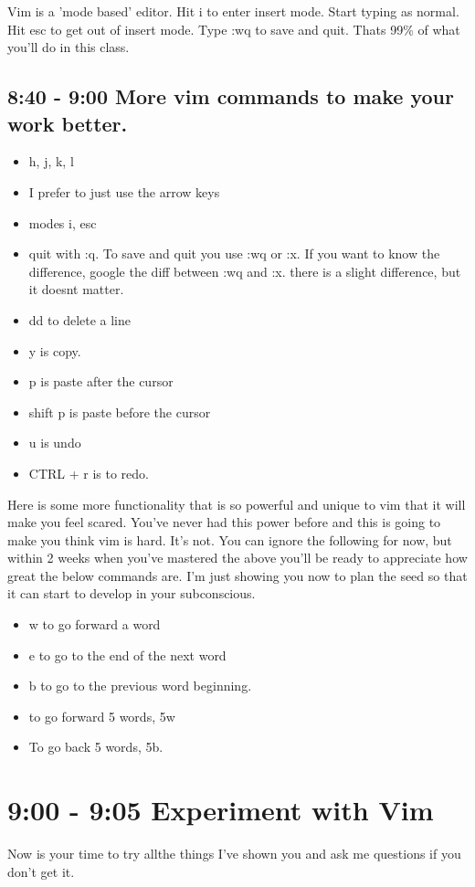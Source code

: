 \documentclass[10pt]{article}
\begin{document}
Vim is a 'mode based' editor. 
Hit i to enter insert mode. Start typing as normal.
Hit esc to get out of insert mode.
Type :wq to save and quit. 
Thats 99\% of what you'll do in this class.

\subsection*{ 8:40 - 9:00 More vim commands to make your work better.}
\begin{itemize}
\item h, j, k, l
\item I prefer to just use the arrow keys
\item modes i, esc
\item quit with :q. To save and quit you use :wq or :x. If you want to know the difference, google the diff between :wq and :x. there is a slight difference, but it doesnt matter.
\item dd to delete a line
\item y is copy.
\item p is paste after the cursor
\item shift p is paste before the cursor
\item u is undo
\item CTRL + r is to redo.
\end{itemize}

Here is some more functionality that is so powerful and unique to vim that it
will make you feel scared. You've never had this power before and this is going
to make you think vim is hard. It's not. You can ignore the following for now,
but within 2 weeks when you've mastered the above you'll be ready to appreciate
how great the below commands are. I'm just showing you now to plan the seed so
that it can start to develop in your subconscious.

\begin{itemize}
\item w to go forward a word
\item e to go to the end of the next word
\item b to go to the previous word beginning.
\item to go forward 5 words, 5w
\item To go back 5 words, 5b.
\end{itemize}

\section*{ 9:00 - 9:05 Experiment with Vim}
Now is your time to try allthe things I've shown you and ask me questions if you
don't get it.
\end{document}
